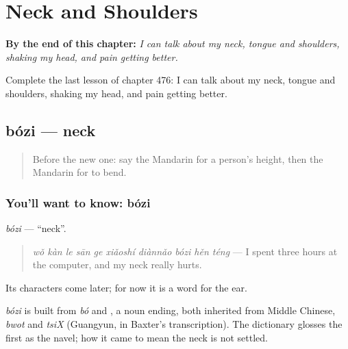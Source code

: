 
\chapter{Neck and Shoulders}
\label{ch:zh-neck-and-shoulders}

\begin{chapteropening}
\textbf{By the end of this chapter:} \emph{I can talk about my neck, tongue and shoulders, shaking my head, and pain getting better.}

Complete the last lesson of chapter 476: I can talk about my neck, tongue and shoulders, shaking my head, and pain getting better.
\end{chapteropening}

\section[bózi]{bózi — neck}

\label{lesson:ZH-C476-bozi}



\begin{quote}
Before the new one: say the Mandarin for a person's height, then the Mandarin for to bend.
\end{quote}

\subsection*{You'll want to know: bózi}
\emph{bózi} — \textquotedblleft{}neck\textquotedblright{}.

\begin{quote}
\emph{wǒ kàn le sān ge xiǎoshí diànnǎo bózi hěn téng} — I spent three hours at the computer, and my neck really hurts.
\end{quote}

Its characters come later; for now it is a word for the ear.

\begin{cousinweb}
\emph{bózi} is built from \emph{bó} and , a noun ending, both inherited from Middle Chinese, \emph{bwot} and \emph{tsiX} (Guangyun, in Baxter's transcription). The dictionary glosses the first as the navel; how it came to mean the neck is not settled.
\end{cousinweb}

